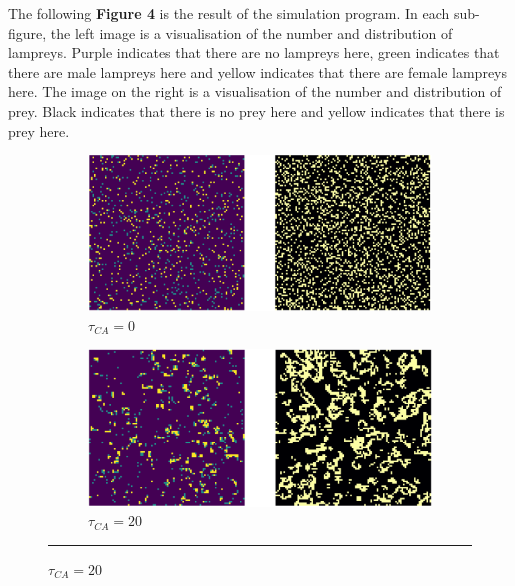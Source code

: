 \documentclass{mcmthesis}
\begin{document}
The following \textbf{Figure 4} is the result of the simulation program. In each sub-figure, the left image is a visualisation of the number and distribution of lampreys. Purple indicates that there are no lampreys here, green indicates that there are male lampreys here and yellow indicates that there are female lampreys here. The image on the right is a visualisation of the number and distribution of prey. Black indicates that there is no prey here and yellow indicates that there is prey here.

\begin{figure}[H]
  \centering
  \begin{subfigure}[b]{0.45\textwidth}
    \includegraphics[width=\textwidth]{figures/NormalSimulation_1.png}
    \caption{$\tau_{CA} = 0$}
    \label{fig:sub1}
  \end{subfigure}
  \hfill
  \begin{subfigure}[b]{0.45\textwidth}
    \includegraphics[width=\textwidth]{figures/NormalSimulation_2.png}
    \caption{$\tau_{CA} = 20$}
    \label{fig:sub2}
  \end{subfigure}

  \vspace*{5pt} %
  \hrule %
  \vspace*{5pt} %
  

\end{figure}
\end{document}
